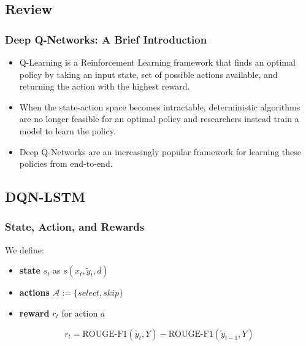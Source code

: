 \documentclass[]{beamer}
\begin{document}
	\subsection{Review}  
	\begin{frame}
			\frametitle{Deep Q-Networks: A Brief Introduction}
		\begin{itemize}
		\item <1 -> Q-Learning is a Reinforcement Learning framework that finds an optimal policy by taking an input state, set of possible actions available,  and returning the action with the highest reward.
		\item <1 -> When the state-action space becomes intractable, deterministic algorithms are no longer feasible for an optimal policy and researchers instead train a model to learn the policy. 
		\item <1 -> Deep Q-Networks \cite{MnihKSGAWR13} are an increasingly popular framework for learning these policies from end-to-end.
		\end{itemize}
	\end{frame}
	
	\subsection{DQN-LSTM}  
	\begin{frame}
		\frametitle{State, Action, and Rewards}
		We define:
		\begin{itemize}
	\item<1 -> \textbf{state} $s_t$ as $s(x_{t},\tilde{y}_{t}, d)$ 
	\item<1 -> \textbf{actions} $\mathcal{A} := \{select, skip\}$
	\item<1 -> \textbf{reward} $r_t$ for action $a$
		\end{itemize}
				\begin{equation}
					r_t = \textrm{ROUGE-F1}(\tilde{y}_{t}, Y) -  \textrm{ROUGE-F1}(\tilde{y}_{t-1}, Y)
				\end{equation}
	\end{frame}
\end{document}
